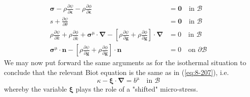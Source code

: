 \begin{subequations}\label{eq:8-203}
    \begin{align}
    \bm{\sigma} - \rho \frac{\partial \psi}{\partial \bm{\epsilon}} -  \rho \frac{\partial \phi}{\partial \dot{\bm{\epsilon}}} &= \bm{0} \quad
    \mbox{in } \mathcal{B}
\label{eq:8-203a}\\
    s + \frac{\partial \psi}{\partial \theta} &= \bm{0} \quad
    \mbox{in } \mathcal{B}
\label{eq:8-203b}\\
    \rho\frac{\partial \psi}{\partial k} + \rho\frac{\partial \phi}{\partial \dot{k}} +
    \bm{\sigma}^{\mathrm{\mu}}\cdot \bm{\nabla} - \left[\rho\frac{\partial \psi}{\partial \bm{g}} + \rho\frac{\partial \phi}{\partial \dot{\bm{g}}}\right] \cdot \bm{\nabla} &= 0 \quad
    \mbox{in }  \mathcal{B}
\label{eq:8-203c} \\
    \bm{\sigma}^{\mathrm{\mu}}\cdot \bm{n} - \left[\rho\frac{\partial \psi}{\partial \bm{g}} + \rho\frac{\partial \phi}{\partial \dot{\bm{g}}}\right] \cdot \bm{n} &= 0 \quad
    \mbox{on }  \partial\mathcal{B}
\label{eq:8-203d}
    \end{align}
\end{subequations}
We may now put forward the same arguments as for the isothermal situation to conclude that the relevant Biot equation is the same as in (\ref{eq:8-207}), i.e.
\begin{equation}
    \kappa - \bm{\xi}\cdot\bm{\nabla} = b^{\mathrm{\mu}} \quad
    \mbox{in }  \mathcal{B}
\label{eq:8-207a}
\end{equation}
whereby the variable $\bm{\xi}$ plays the role of a "shifted" micro-stress.

